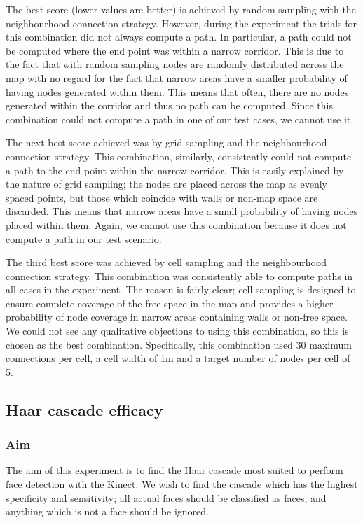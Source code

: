 \documentclass[conference]{IEEEtran}
\begin{document}
The best score (lower values are better) is achieved by random sampling with the neighbourhood connection strategy. However, during the experiment the trials for this combination did not always compute a path. In particular, a path could not be computed where the end point was within a narrow corridor. This is due to the fact that with random sampling nodes are randomly distributed across the map with no regard for the fact that narrow areas have a smaller probability of having nodes generated within them. This means that often, there are no nodes generated within the corridor and thus no path can be computed. Since this combination could not compute a path in one of our test cases, we cannot use it.

The next best score achieved was by grid sampling and the neighbourhood connection strategy. This combination, similarly, consistently could not compute a path to the end point within the narrow corridor. This is easily explained by the nature of grid sampling; the nodes are placed across the map as evenly spaced points, but those which coincide with walls or non-map space are discarded. This means that narrow areas have a small probability of having nodes placed within them. Again, we cannot use this combination because it does not compute a path in our test scenario.

The third best score was achieved by cell sampling and the neighbourhood connection strategy. This combination was consistently able to compute paths in all cases in the experiment. The reason is fairly clear; cell sampling is designed to ensure complete coverage of the free space in the map and provides a higher probability of node coverage in narrow areas containing walls or non-free space. We could not see any qualitative objections to using this combination, so this is chosen as the best combination. Specifically, this combination used 30 maximum connections per cell, a cell width of 1m and a target number of nodes per cell of 5.


\subsection{Haar cascade efficacy}

\subsubsection{Aim}
The aim of this experiment is to find the Haar cascade most suited to perform face detection with the Kinect. We wish to find the cascade which has the highest specificity and sensitivity; all actual faces should be classified as faces, and anything which is not a face should be ignored.
\end{document}
